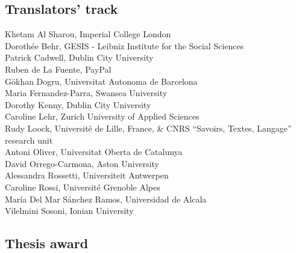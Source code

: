 \documentclass[a4paper,11pt,twoside]{book}
\begin{document}
\subsection*{Translators' track}
\noindent Khetam Al Sharou, Imperial College London\\
\noindent Dorothée Behr, GESIS - Leibniz Institute for the Social Sciences\\
\noindent Patrick Cadwell, Dublin City University\\
\noindent Ruben de La Fuente, PayPal\\
\noindent Gökhan Dogru, Universitat Autonoma de Barcelona\\
\noindent Maria Fernandez-Parra, Swansea University\\
\noindent Dorothy Kenny, Dublin City University\\
\noindent Caroline Lehr, Zurich University of Applied Sciences\\
\noindent Rudy Loock, Université de Lille, France, \& CNRS ``Savoirs, Textes, Langage'' research unit\\
\noindent Antoni Oliver, Universitat Oberta de Catalunya\\
\noindent David Orrego-Carmona, Aston University\\
\noindent Alessandra Rossetti, Universiteit Antwerpen\\
\noindent Caroline Rossi, Université Grenoble Alpes\\
\noindent María Del Mar Sánchez Ramos, Universidad de Alcala\\
\noindent Vilelmini Sosoni, Ionian University\\

\clearpage

\subsection*{Thesis award}
\end{document}
